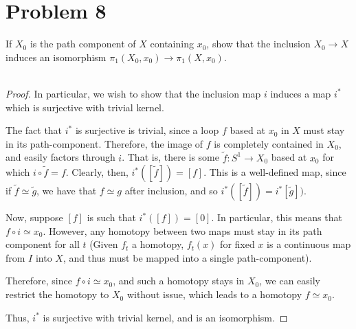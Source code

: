 \documentclass[fontsize=11pt]{scrartcl} %
\numberwithin{equation}{section} %
\numberwithin{figure}{section} %
\numberwithin{table}{section} %
\begin{document}
\newpage

\section*{Problem 8} %
If $X_0$ is the path component of $X$ containing $x_0$, show that the inclusion
$X_0\to X$ induces an isomorphism $\pi_1(X_0,x_0)\to\pi_1(X,x_0)$.
\\
\\
\begin{proof}
    In particular, we wish to show that the inclusion map $i$ induces a map
    $i^*$ which is surjective with trivial kernel.

    The fact that $i^*$ is surjective is trivial, since a loop $f$ based at
    $x_0$ in $X$ must stay in its path-component. Therefore, the image of $f$ is
    completely contained in $X_0$, and easily factors through $i$. That is,
    there is some $\tilde{f}:S^1\to X_0$ based at $x_0$ for which
    $i\circ\tilde{f} = f$. Clearly, then, $i^*([\tilde{f}]) = [f]$. This is a
    well-defined map, since if $\tilde{f}\simeq \tilde{g}$, we have that
    $f\simeq g$ after inclusion, and so $i^*([\tilde{f}]) = i^*[\tilde{g}])$.

    Now, suppose $[f]$ is such that $i^*([f]) = [0]$. In particular, this means
    that $f\circ i\simeq x_0$. However, any homotopy between two maps must stay
    in its path component for all $t$ (Given $f_t$ a homotopy, $f_t(x)$ for
    fixed $x$ is a continuous map from $I$ into $X$, and thus must be mapped
    into a single path-component).

    Therefore, since $f\circ i \simeq x_0$, and such a homotopy stays in $X_0$,
    we can easily restrict the homotopy to $X_0$ without issue, which leads to a
    homotopy $f\simeq x_0$.

    Thus, $i^*$ is surjective with trivial kernel, and is an isomorphism.
\end{proof}

\newpage
\end{document}
